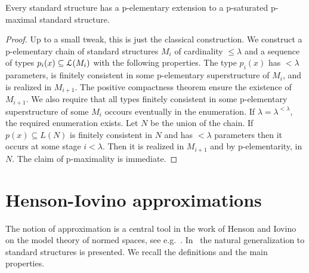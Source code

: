 \documentclass{amsproc}
\begin{document}
\begin{theorem}
  Every standard structure has a p-elementary extension to a p-satu\-rated p-maximal standard structure.
\end{theorem}

\begin{proof}
  Up to a small tweak, this is just the classical construction.
  We construct a p-elementary chain of standard structures $M_i$ of cardinality $\le\lambda$ and a sequence of types $p_i(x)\subseteq{\EuScript L}(M_i)$ with the following properties.
  The type $p_i(x)$ has $<\lambda$ parameters, is finitely consistent in some p-elementary superstructure of $M_i$, and is realized in $M_{i+1}$.
  The positive compactness theorem ensure the existence of $M_{i+1}$.
  We also require that all types finitely consistent in some p-elementary superstructure of some $M_i$ occours eventually in the enumeration.
  If $\lambda=\lambda^{<\lambda}$, the required enumeration exists.
  Let $N$ be the union of the chain.
  If $p(x)\subseteq L(N)$ is finitely consistent in $N$ and has $<\lambda$ parameters then it occurs at some stage $i<\lambda$. 
  Then it is realized in $M_{i+1}$ and by p-elementarity, in $N$.
  The claim of p-maximality is immediate.
\end{proof}





\section{Henson-Iovino approximations}\label{ultrapws} 
The notion of approximation is a central tool in the work of Henson and Iovino on the model theory of normed spaces, see e.g.~\cite{HI}.
In~\cite{clcl} the natural generalization to standard structures is presented.
We recall the definitions and the main properties.
\end{document}
